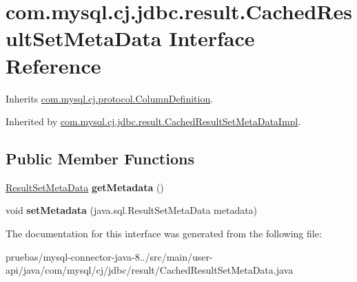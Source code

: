 \hypertarget{interfacecom_1_1mysql_1_1cj_1_1jdbc_1_1result_1_1_cached_result_set_meta_data}{}\section{com.\+mysql.\+cj.\+jdbc.\+result.\+Cached\+Result\+Set\+Meta\+Data Interface Reference}
\label{interfacecom_1_1mysql_1_1cj_1_1jdbc_1_1result_1_1_cached_result_set_meta_data}


Inherits \mbox{\hyperlink{interfacecom_1_1mysql_1_1cj_1_1protocol_1_1_column_definition}{com.\+mysql.\+cj.\+protocol.\+Column\+Definition}}.



Inherited by \mbox{\hyperlink{classcom_1_1mysql_1_1cj_1_1jdbc_1_1result_1_1_cached_result_set_meta_data_impl}{com.\+mysql.\+cj.\+jdbc.\+result.\+Cached\+Result\+Set\+Meta\+Data\+Impl}}.

\subsection*{Public Member Functions}
\begin{DoxyCompactItemize}
\item 
\mbox{\label{interfacecom_1_1mysql_1_1cj_1_1jdbc_1_1result_1_1_cached_result_set_meta_data_a80240641b218f0bfb75d3a06669ab0c1}} 
\mbox{\hyperlink{classcom_1_1mysql_1_1cj_1_1jdbc_1_1result_1_1_result_set_meta_data}{Result\+Set\+Meta\+Data}} {\bfseries get\+Metadata} ()
\item 
\mbox{\label{interfacecom_1_1mysql_1_1cj_1_1jdbc_1_1result_1_1_cached_result_set_meta_data_a29872cda6030096e51fc2397fa3b7135}} 
void {\bfseries set\+Metadata} (java.\+sql.\+Result\+Set\+Meta\+Data metadata)
\end{DoxyCompactItemize}


The documentation for this interface was generated from the following file\+:\begin{DoxyCompactItemize}
\item 
pruebas/mysql-\/connector-\/java-\/8../src/main/user-\/api/java/com/mysql/cj/jdbc/result/Cached\+Result\+Set\+Meta\+Data.\+java\end{DoxyCompactItemize}
